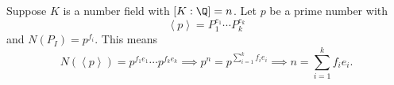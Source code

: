 \documentclass[pmath441]{subfiles}
\begin{document}
    \np Suppose $K$ is a number field with $\left[ K:\Q \right] = n$. Let $p$ be a prime number with
    \begin{equation*}
        \left< p \right> = P_1^{e_1}\cdots P_k^{e_k} 
    \end{equation*}
    and $N\left( P_I \right) = p^{f_i}$. This means
    \begin{equation*}
        N\left( \left< p \right>  \right) = p^{f_1e_1}\cdots p^{f_ke_k} \implies p^n = p^{\sum^{k}_{i=1}f_ie_i} \implies n = \sum^{k}_{i=1}f_ie_i.
    \end{equation*}
    
    
    
    
    
    
    
    
    
    
    
    
    
    
    
    
    
    
    
    
    
    
    
    
    
    
    
    
    
    
    
    
    
    
    
    
    
    
\end{document}
